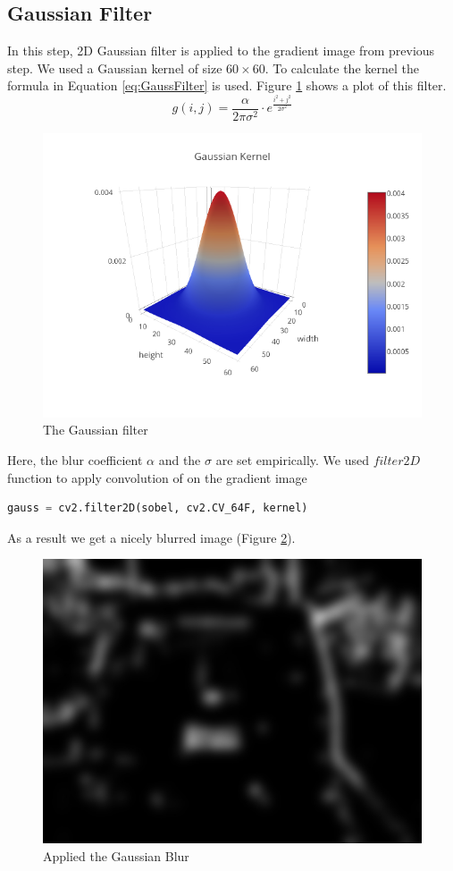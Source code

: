 \documentclass{standalone}
\begin{document}
\subsection{Gaussian Filter}
In this step, 2D Gaussian filter is applied to the gradient image from previous step. We used a Gaussian kernel of size $60 \times 60$. To calculate the kernel the formula in Equation \ref{eq:GaussFilter} is used. Figure \ref{fig:GaussianFilterPlot} shows a plot of this filter.
\begin{equation} \label{eq:GaussFilter}
g(i, j) = \dfrac{\alpha}{2\pi\sigma^2} \cdot e^{\frac{i^2 + j^2}{2\sigma^2}}
\end{equation}

\begin{figure} 
	\centering
	\includegraphics[width=.8\linewidth]{./img/plots/gauss.png}
	\caption{The Gaussian filter} 
	\label{fig:GaussianFilterPlot}
\end{figure}

Here, the blur coefficient $\alpha$ and the $\sigma$ are set empirically. We used $filter2D$ function to apply convolution of on the gradient image
\begin{lstlisting}[language=Python]
gauss = cv2.filter2D(sobel, cv2.CV_64F, kernel)
\end{lstlisting}

As a result we get a nicely blurred image (Figure \ref{fig:GaussianSample}).
\begin{figure}
	\centering
	\includegraphics[width=.8\linewidth]{./img/sample/stage3.jpg}
	\caption{Applied the Gaussian Blur} 
	\label{fig:GaussianSample}
\end{figure}
\end{document}
